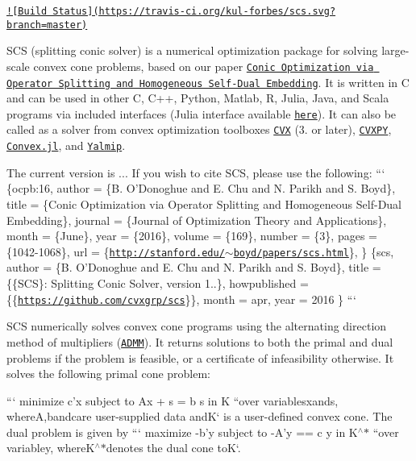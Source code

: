 \href{https://travis-ci.org/kul-forbes/scs}{\tt !\mbox{[}Build Status\mbox{]}(https\-://travis-\/ci.\-org/kul-\/forbes/scs.\-svg?branch=master)}

S\-C\-S ({\ttfamily splitting conic solver}) is a numerical optimization package for solving large-\/scale convex cone problems, based on our paper \href{http://www.stanford.edu/~boyd/papers/scs.html}{\tt Conic Optimization via Operator Splitting and Homogeneous Self-\/\-Dual Embedding}. It is written in C and can be used in other C, C++, Python, Matlab, R, Julia, Java, and Scala programs via included interfaces (Julia interface available \href{https://github.com/JuliaOpt/SCS.jl}{\tt here}). It can also be called as a solver from convex optimization toolboxes \href{http://cvxr.com/cvx/}{\tt C\-V\-X} (3. or later), \href{https://github.com/cvxgrp/cvxpy}{\tt C\-V\-X\-P\-Y}, \href{https://github.com/JuliaOpt/Convex.jl}{\tt Convex.\-jl}, and \href{https://github.com/johanlofberg/YALMIP}{\tt Yalmip}.

The current version is {..}. If you wish to cite S\-C\-S, please use the following\-: ``` \{ocpb\-:16, author = \{B. O'Donoghue and E. Chu and N. Parikh and S. Boyd\}, title = \{Conic Optimization via Operator Splitting and Homogeneous Self-\/\-Dual Embedding\}, journal = \{Journal of Optimization Theory and Applications\}, month = \{June\}, year = \{2016\}, volume = \{169\}, number = \{3\}, pages = \{1042-\/1068\}, url = \{\href{http://stanford.edu/~boyd/papers/scs.html}{\tt http\-://stanford.\-edu/$\sim$boyd/papers/scs.\-html}\}, \} \{scs, author = \{B. O'Donoghue and E. Chu and N. Parikh and S. Boyd\}, title = \{\{S\-C\-S\}\-: Splitting Conic Solver, version 1..\}, howpublished = \{\{\href{https://github.com/cvxgrp/scs}{\tt https\-://github.\-com/cvxgrp/scs}\}\}, month = apr, year = 2016 \} ``` 

 S\-C\-S numerically solves convex cone programs using the alternating direction method of multipliers (\href{http://web.stanford.edu/~boyd/papers/admm_distr_stats.html}{\tt A\-D\-M\-M}). It returns solutions to both the primal and dual problems if the problem is feasible, or a certificate of infeasibility otherwise. It solves the following primal cone problem\-:

``` minimize c'x subject to Ax + s = b s in K ``{\ttfamily  over variables}x{\ttfamily and}s{\ttfamily , where}A{\ttfamily ,}b{\ttfamily and}c{\ttfamily are user-\/supplied data and}K` is a user-\/defined convex cone. The dual problem is given by ``` maximize -\/b'y subject to -\/\-A'y == c y in K$^\wedge$$\ast$ ``{\ttfamily  over variable}y{\ttfamily , where}K$^\wedge$$\ast${\ttfamily denotes the dual cone to}K`.

